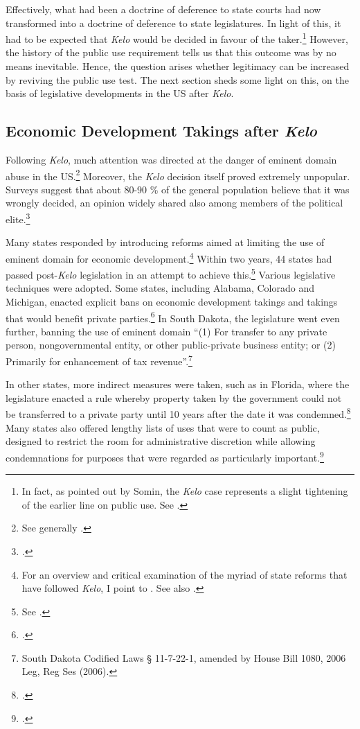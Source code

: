 Effectively, what had been a doctrine of deference to state courts had now transformed into a doctrine of deference to state legislatures. In light of this, it had to be expected that {\it Kelo} would be decided in favour of the taker.\footnote{In fact, as pointed out by Somin, the {\it Kelo} case represents a slight tightening of the earlier line on public use. See \cite{somin07}.} However, the history of the public use requirement tells us that this outcome was by no means inevitable. Hence, the question arises whether legitimacy can be increased by reviving the public use test. The next section sheds some light on this, on the basis of legislative developments in the US after {\it Kelo}.

\subsection{Economic Development Takings after {\it Kelo}}\label{sec:3:3:2}

Following {\it Kelo}, much attention was directed at the danger of eminent domain abuse in the US.\footnote{See generally \cite{somin09}.} Moreover, the {\it Kelo} decision itself proved extremely unpopular. Surveys suggest that about 80-90 \% of the general population believe that it was wrongly decided, an opinion widely shared also among members of the political elite.\footcite[2109]{somin09}

Many states responded by introducing reforms aimed at limiting the use of eminent domain for economic development.\footnote{For an overview and critical examination of the myriad of state reforms that have followed {\it Kelo}, I point to \cite{eagle08}. See also \cite{somin09}.} Within two years, 44 states had passed post-{\it Kelo} legislation in an attempt to achieve this.\footnote{See \cite{castle}.} Various legislative techniques were adopted. Some states, including Alabama, Colorado and Michigan, enacted explicit bans on economic development takings and takings that would benefit private parties.\footcite[See][107-108]{eagle08} In South Dakota, the legislature went even further, banning the use of eminent domain ``(1) For transfer to any private person, nongovernmental entity, or other public-private business entity; or (2) Primarily for enhancement of tax revenue''.\footnote{South Dakota Codified Laws § 11-7-22-1, amended by House Bill 1080, 2006 Leg, Reg Ses (2006).}

In other states, more indirect measures were taken, such as in Florida, where the legislature enacted a rule whereby property taken by the government could not be transferred to a private party until 10 years after the date it was condemned.\footcite[809]{eagle08} Many states also offered lengthy lists of uses that were to count as public, designed to restrict the room for administrative discretion while allowing condemnations for purposes that were regarded as particularly important.\footcite[804]{eagle08}

